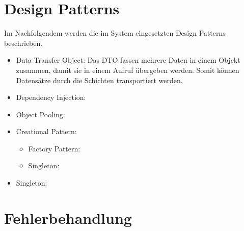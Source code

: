 \section{Design Patterns}
Im Nachfolgendem werden die im System eingesetzten Design Patterns beschrieben.
	\begin{itemize}
		\item Data Transfer Object: Das DTO fassen mehrere Daten in einem Objekt zusammen, damit sie in einem Aufruf übergeben werden. Somit können Datensätze durch die Schichten transportiert werden.
		\item Dependency Injection: 
		\item Object Pooling:
		\item Creational Pattern:
			\begin{itemize}
				\item Factory Pattern:
				\item Singleton:
			\end{itemize}
		\item Singleton:
	\end{itemize}
\section{Fehlerbehandlung}		     

